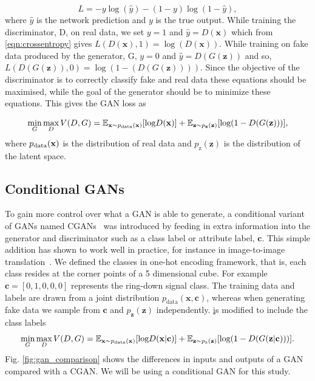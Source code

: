 \documentclass[12pt]{iopart}
\begin{document}
\begin{equation}
    L = -y \log(\hat{y}) - (1 - y) \log(1-\hat{y}),
    \label{eqn:crossentropy}
\end{equation}
where $\hat{y}$ is the network prediction and $y$ is the true output. While training the discriminator, D, on real data, we set $y = 1$ and $\hat{y} = D(\mathbf{x})$ which from \cref{eqn:crossentropy} gives $L(D(\mathbf{x}),1) = \log(D(\mathbf{x}))$. While training on fake data produced by the generator, G, $y = 0$ and $\hat{y} = D(G(\mathbf{z}))$ and so, $L(D(G(\mathbf{z})),0) = \log(1-(D(G(\mathbf{z}))))$. Since the objective of the discriminator is to correctly classify fake and real data these equations should be maximised, while the goal of the generator should be to minimize these equations. This gives the \ac{GAN} loss as

\begin{equation}
   \mathop{\text{min}}_{G}  \mathop{\text{max}}_{D} V(D,G) = \mathbb{E}_{\mathbf{x} \sim p_{\text{\text{data}}}(\mathbf{x})} [\text{log} D(\mathbf{x})] + \mathbb{E}_{\mathbf{z} \sim p_{\mathbf{z}}(\mathbf{z})} [\text{log}(1-D(G(\mathbf{z})))],
 \label{equation:GANloss}
 \end{equation}
where $p_{\text{\text{data}}}(\mathbf{x})$ is the distribution of real data and $p_{\text{z}}(\mathbf{z})$ is the distribution of the latent space. 

\subsection{Conditional GANs}

%
To gain more control over what a GAN is able to generate, a conditional variant
of \acp{GAN} named \acp{CGAN}~\cite{cgan} was introduced by feeding in extra
information into the generator and discriminator such as a class label or
attribute label, $\mathbf{c}$. This simple addition has shown to work well in practice, for instance in image-to-image translation~\cite{isola2016imagetoimage}. We defined the classes in one-hot encoding framework, that is, each class resides at the corner points of a 5 dimensional cube. For example $\mathbf{c}=[0,1,0,0,0]$ represents the ring-down signal class. The training data and labels are drawn from a joint distribution $p_{\text{data}}(\mathbf{x},\mathbf{c})$, whereas when generating fake data we sample from $\mathbf{c}$ and $p_{\mathbf{z}}(\mathbf{z})$ independently. \href{equation:GANloss} is modified to include the class labels 
~
\begin{equation}
   \mathop{\text{min}}_{G}  \mathop{\text{max}}_{D} V(D,G) = \mathbb{E}_{\mathbf{x} \sim p_{\text{\text{data}}}(\mathbf{x})} [\text{log} D(\mathbf{x|c})] + \mathbb{E}_{\mathbf{z} \sim p_{\text{z}}(\mathbf{z})} [\text{log}(1-D(G(\mathbf{z|c})))].
 \label{equation:CGANloss}
 \end{equation}
Fig. \ref{fig:gan_comparison} shows the differences in inputs and outputs of a GAN compared with a \ac{CGAN}. We will be using a conditional GAN for this study.
\end{document}
